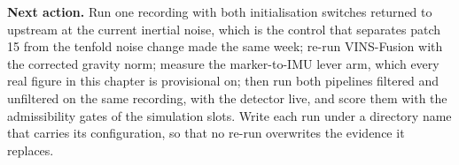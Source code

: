 \documentclass[11pt,a4paper,notitlepage]{report}
\begin{document}
\textbf{Next action.} Run one  recording with both initialisation
switches returned to upstream at the current inertial noise, which is the
control that separates patch 15 from the tenfold noise change made the same
week; re-run VINS-Fusion with the corrected gravity norm; measure the
marker-to-IMU lever arm, which every real figure in this chapter is provisional
on; then run both pipelines filtered and unfiltered on the same recording, with
the detector live, and score them with the admissibility gates of the
simulation slots. Write each run under a directory name that carries its
configuration, so that no re-run overwrites the evidence it replaces.
\end{document}
